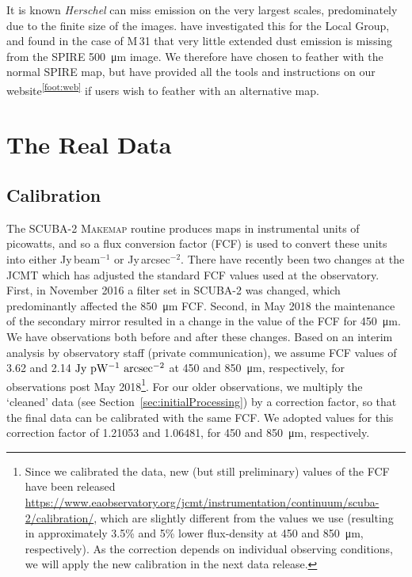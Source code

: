 \documentclass[a4paper,fleqn,usenatbib, twocolumn]{aastex63}
\begin{document}
It is known \textit{Herschel} can miss emission on the very largest scales, predominately due to the finite size of the images.
\citet{Clark2021} have investigated this for the Local Group, and found in the case of M\,31 that very little extended dust emission is missing from the SPIRE \SI{500}{\micro\meter} image. We therefore have chosen to feather with the normal SPIRE map, but have provided all the tools and instructions on our website\textsuperscript{\ref{foot:web}} if users wish to feather with an alternative map.


\section{The Real Data}
\label{sec:realData}

\subsection{Calibration}

The SCUBA-2 \textsc{Makemap} routine produces maps in instrumental units of picowatts, and so a flux conversion factor (FCF) is 
used to convert these units into either Jy\,beam$^{-1}$ or Jy\,arcsec$^{-2}$.
There have recently been two changes at the JCMT which has adjusted the standard FCF values used
at the observatory. First, in November 2016 a filter set in SCUBA-2 was changed, which predominantly affected the
\SI{850}{\micro\meter} FCF. Second, in May 2018 the maintenance of the secondary
mirror resulted in a change in the value of the FCF for \SI{450}{\micro\meter}. We
have observations both before and after these changes. Based on an interim analysis by observatory staff (private communication), 
we assume FCF values of 3.62 and 2.14 $\rm Jy\ pW^{-1}\ arcsec^{-2}$ at 450 and \SI{850}{\micro\meter}, respectively, for observations post May 2018\footnote{Since we calibrated the data, new (but still preliminary) values of the FCF
have been released \url{https://www.eaobservatory.org/jcmt/instrumentation/continuum/scuba-2/calibration/}, which are slightly different 
from the values we use (resulting in approximately 3.5\% and 5\% lower flux-density at 450 and \SI{850}{\micro\meter}, respectively). As the correction depends on 
individual observing conditions, we will apply the new calibration in the next data release.}.
For our older observations, we multiply the `cleaned' data (see Section~\ref{sec:initialProcessing}) by a correction factor, so that the final data can be calibrated with the same FCF. We adopted values for this correction factor of 1.21053 and 1.06481, for 450 and \SI{850}{\micro\meter}, respectively. 
\end{document}
